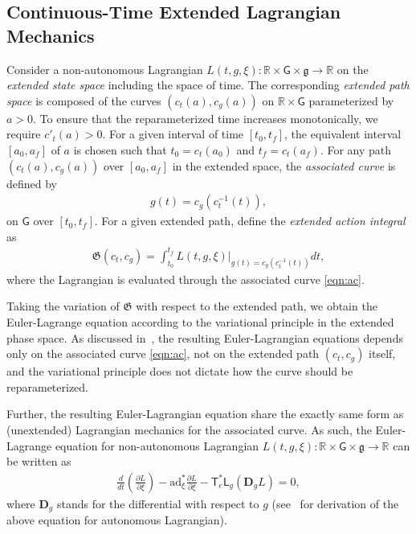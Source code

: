 \documentclass[letterpaper, 10pt, conference]{ieeeconf}
\newcommand{\parenth}[1]{\ensuremath{\left( #1 \right)}}
\newcommand{\deriv}[2]{\ensuremath{\frac{\partial #1}{\partial #2}}}
\newcommand{\G}{\ensuremath{\mathsf{G}}}
\newcommand{\T}{\ensuremath{\mathsf{T}}}
\renewcommand{\L}{\ensuremath{\mathsf{L}}}
\renewcommand{\Re}{\ensuremath{\mathbb{R}}}
\newcommand{\D}{\ensuremath{\mathbf{D}}}
\newcommand{\ad}{\ensuremath{\mathrm{ad}}}
\newcommand{\g}{\ensuremath{\mathfrak{g}}}
\begin{document}
\subsection{Continuous-Time Extended Lagrangian Mechanics}

Consider a non-autonomous Lagrangian $L(t,g,\xi):\Re\times\G\times\g\rightarrow \Re$ on the \textit{extended state space} including the space of time.
The corresponding \textit{extended path space} is composed of the curves $(c_t(a),c_g(a))$ on $\Re\times \G$ parameterized by $a>0$.
To ensure that the reparameterized time increases monotonically, we require $c'_t(a) > 0$. 
For a given interval of time $[t_0,t_f]$, the equivalent interval $[a_0,a_f]$ of $a$ is chosen such that $t_0=c_t(a_0)$ and $t_f=c_t(a_f)$.
For any path $(c_t(a),c_g(a))$ over $[a_0,a_f]$ in the extended space, the \textit{associated curve} is defined by
\begin{align}
    g(t) = c_g(c_t^{-1}(t)),\label{eqn:ac}
\end{align}
on $\G$ over $[t_0,t_f]$.
For a given extended path, define the \textit{extended action integral} as
\begin{align}
    \mathfrak{G}(c_t,c_g) = \int_{t_0}^{t_f} L(t,g,\xi)\bigg|_{g(t) = c_g(c_t^{-1}(t))} dt,\label{eqn:AI}
\end{align}
where the Lagrangian is evaluated through the associated curve \eqref{eqn:ac}.

Taking the variation of $\mathfrak{G}$ with respect to the extended path, we obtain the Euler-Lagrange equation according to the variational principle in the extended phase space. 
As discussed in~\cite[Sec. 4.2.2]{MarWesAN01}, the resulting Euler-Lagrangian equations depends only on the associated curve \eqref{eqn:ac}, not on the extended path $(c_t,c_g)$ itself, and the variational principle does not dictate how the curve should be reparameterized. 

Further, the resulting Euler-Lagrangian equation share the exactly same form as (unextended) Lagrangian mechanics for the associated curve. 
As such, the Euler-Lagrange equation for non-autonomous Lagrangian $L(t,g,\xi):\Re\times\G\times\g\rightarrow \Re$ can be written as
\begin{align}
    \frac{d}{dt}\!\parenth{\deriv{L}{\xi}} - \ad^*_\xi \deriv{L}{\xi} - \T^*_e \L_g (\D_g L) = 0, \label{eqn:EL}
\end{align}
where $\D_g$ stands for the differential with respect to $g$ (see~\cite[Sec. 8.6.3]{LeeLeo17} for derivation of the above equation for autonomous Lagrangian).
\end{document}
